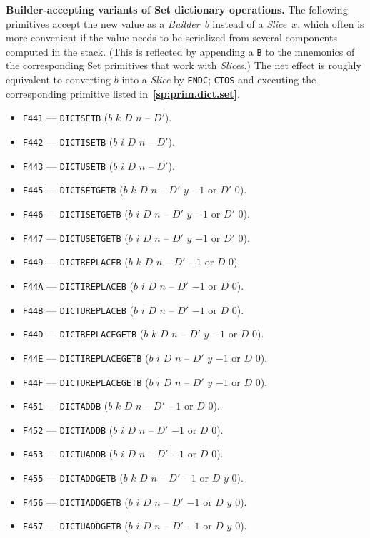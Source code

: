 \documentclass[12pt,oneside]{article}
\def\makepoint#1{\medbreak\noindent{\bf #1.\ }}
\def\nxsubpoint{\refstepcounter{subsubsection}%
  \smallbreak\makepoint{\thesubsubsection}}
\def\refpoint#1{{\rm\textbf{\ref{#1}}}}
\let\ptref=\refpoint
\def\emb#1{\textbf{#1.}}
\begin{document}
\nxsubpoint\label{sp:prim.dict.set.builder}\emb{Builder-accepting variants of {\sc Set} dictionary operations}
The following primitives accept the new value as a {\em Builder}~$b$ instead of a {\em Slice}~$x$, which often is more convenient if the value needs to be serialized from several components computed in the stack. (This is reflected by appending a {\tt B} to the mnemonics of the corresponding {\sc Set} primitives that work with {\em Slice\/}s.) The net effect is roughly equivalent to converting $b$ into a {\em Slice\/} by {\tt ENDC}; {\tt CTOS} and executing the corresponding primitive listed in~\ptref{sp:prim.dict.set}.
\begin{itemize}
\item {\tt F441} --- {\tt DICTSETB} ($b$ $k$ $D$ $n$ -- $D'$).
\item {\tt F442} --- {\tt DICTISETB} ($b$ $i$ $D$ $n$ -- $D'$).
\item {\tt F443} --- {\tt DICTUSETB} ($b$ $i$ $D$ $n$ -- $D'$).
\item {\tt F445} --- {\tt DICTSETGETB} ($b$ $k$ $D$ $n$ -- $D'$ $y$ $-1$ or $D'$ $0$).
\item {\tt F446} --- {\tt DICTISETGETB} ($b$ $i$ $D$ $n$ -- $D'$ $y$ $-1$ or $D'$ $0$).
\item {\tt F447} --- {\tt DICTUSETGETB} ($b$ $i$ $D$ $n$ -- $D'$ $y$ $-1$ or $D'$ $0$).
\item {\tt F449} --- {\tt DICTREPLACEB} ($b$ $k$ $D$ $n$ -- $D'$ $-1$ or $D$ $0$).
\item {\tt F44A} --- {\tt DICTIREPLACEB} ($b$ $i$ $D$ $n$ -- $D'$ $-1$ or $D$ $0$).
\item {\tt F44B} --- {\tt DICTUREPLACEB} ($b$ $i$ $D$ $n$ -- $D'$ $-1$ or $D$ $0$).
\item {\tt F44D} --- {\tt DICTREPLACEGETB} ($b$ $k$ $D$ $n$ -- $D'$ $y$ $-1$ or $D$ $0$).
\item {\tt F44E} --- {\tt DICTIREPLACEGETB} ($b$ $i$ $D$ $n$ -- $D'$ $y$ $-1$ or $D$ $0$).
\item {\tt F44F} --- {\tt DICTUREPLACEGETB} ($b$ $i$ $D$ $n$ -- $D'$ $y$ $-1$ or $D$ $0$).
\item {\tt F451} --- {\tt DICTADDB} ($b$ $k$ $D$ $n$ -- $D'$ $-1$ or $D$ $0$).
\item {\tt F452} --- {\tt DICTIADDB} ($b$ $i$ $D$ $n$ -- $D'$ $-1$ or $D$ $0$).
\item {\tt F453} --- {\tt DICTUADDB} ($b$ $i$ $D$ $n$ -- $D'$ $-1$ or $D$ $0$).
\item {\tt F455} --- {\tt DICTADDGETB} ($b$ $k$ $D$ $n$ -- $D'$ $-1$ or $D$ $y$ $0$).
\item {\tt F456} --- {\tt DICTIADDGETB} ($b$ $i$ $D$ $n$ -- $D'$ $-1$ or $D$ $y$ $0$).
\item {\tt F457} --- {\tt DICTUADDGETB} ($b$ $i$ $D$ $n$ -- $D'$ $-1$ or $D$ $y$ $0$).
\end{itemize}
\end{document}
